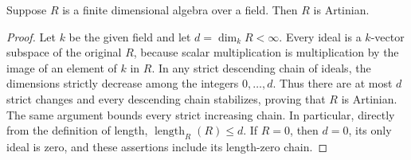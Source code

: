 \begin{lemma}
\label{editorial-source-lemma-finite-dimensional-algebra}
Suppose $R$ is a finite dimensional algebra over a field.
Then $R$ is Artinian.
\end{lemma}

\begin{proof}
Let $k$ be the given field and let $d=\dim_k R<\infty$.
Every ideal is a $k$-vector subspace of the original $R$,
because scalar multiplication is multiplication by the image
of an element of $k$ in $R$. In any strict descending chain
of ideals, the dimensions strictly decrease among the integers
$0,\ldots,d$. Thus there are at most $d$ strict changes and
every descending chain stabilizes, proving that $R$ is Artinian.
The same argument bounds every strict increasing chain.
In particular, directly from the definition of length,
$\operatorname{length}_R(R)\leq d$.
If $R=0$, then $d=0$, its only ideal is zero, and these
assertions include its length-zero chain.
\end{proof}